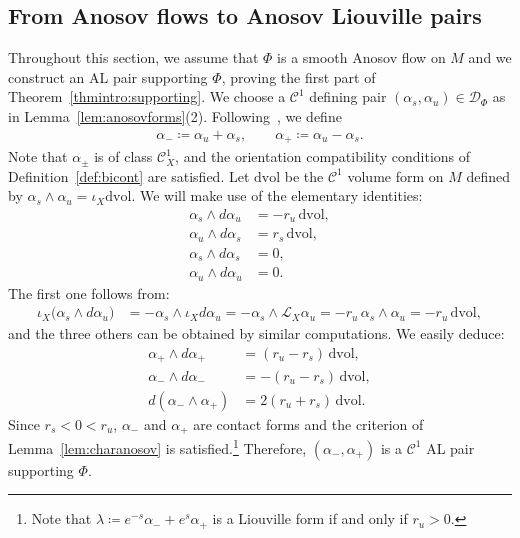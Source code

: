\documentclass[letterpaper, 11pt]{article}
\numberwithin{equation}{section}
\begin{document}
	   \subsection{From Anosov flows to Anosov Liouville pairs} \label{sec:std}
	
Throughout this section, we assume that $\Phi$ is a smooth Anosov flow on $M$ and we construct an AL pair supporting $\Phi$, proving the first part of Theorem~\ref{thmintro:supporting}. We choose a $\mathcal{C}^1$ defining pair $(\alpha_s, \alpha_u) \in \mathcal{D}_\Phi$ as in Lemma~\ref{lem:anosovforms}(2). Following~\cite[Section 4]{H22a}, we define
\begin{align} \label{eq:standard}
    \alpha_- \coloneqq \alpha_u +\alpha_s, \qquad \alpha_+ \coloneqq  \alpha_u - \alpha_s.
\end{align}
Note that $\alpha_\pm$ is of class $\mathcal{C}_X^1$, and the orientation compatibility conditions of Definition~\ref{def:bicont} are satisfied. Let $\mathrm{dvol}$ be the $\mathcal{C}^1$ volume form on $M$ defined by $\alpha_s \wedge \alpha_u = \iota_X \mathrm{dvol}$. We will make use of the elementary identities:
\begin{align*}
\alpha_s \wedge d\alpha_u &= -r_u \, \mathrm{dvol},\\
\alpha_u \wedge d\alpha_s &= r_s \, \mathrm{dvol}, \\
\alpha_s \wedge d\alpha_s &= 0,\\
\alpha_u \wedge d\alpha_u &= 0.
\end{align*}
The first one follows from:
\begin{align*}
    \iota_X\big( \alpha_s \wedge d\alpha_u \big)&= - \alpha_s \wedge \iota_X d\alpha_u = - \alpha_s \wedge \mathcal{L}_X \alpha_u = -r_u \, \alpha_s \wedge \alpha_u = -r_u \, \mathrm{dvol},
\end{align*}
and the three others can be obtained by similar computations. We easily deduce:
\begin{align*}
\alpha_+ \wedge d\alpha_+ &= (r_u - r_s) \, \mathrm{dvol}, \\
\alpha_- \wedge d\alpha_- &= - (r_u - r_s) \, \mathrm{dvol}, \\
d(\alpha_- \wedge \alpha_+) &= 2 (r_u + r_s) \, \mathrm{dvol}.
\end{align*}
Since $r_s < 0 < r_u$, $\alpha_-$ and $\alpha_+$ are contact forms and the criterion of Lemma~\ref{lem:charanosov} is satisfied.\footnote{Note that $\lambda \coloneqq  e^{-s} \alpha_- + e^s \alpha_+$ is a Liouville form if and only if $r_u > 0$.} Therefore, $(\alpha_-, \alpha_+)$ is a $\mathcal{C}^1$ AL pair supporting $\Phi$. 
\end{document}
